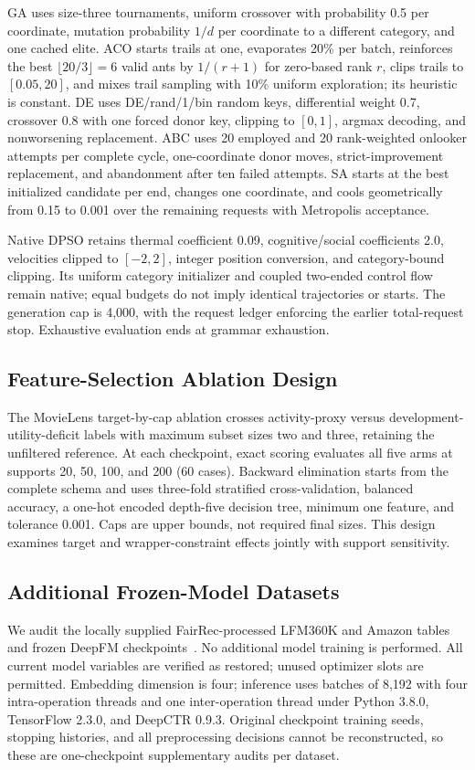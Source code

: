 GA uses size-three tournaments, uniform crossover with probability 0.5 per coordinate, mutation probability $1/d$ per coordinate to a different category, and one cached elite. ACO starts trails at one, evaporates 20\% per batch, reinforces the best $\lfloor20/3\rfloor=6$ valid ants by $1/(r+1)$ for zero-based rank $r$, clips trails to $[0.05,20]$, and mixes trail sampling with 10\% uniform exploration; its heuristic is constant. DE uses DE/rand/1/bin random keys, differential weight 0.7, crossover 0.8 with one forced donor key, clipping to $[0,1]$, argmax decoding, and nonworsening replacement. ABC uses 20 employed and 20 rank-weighted onlooker attempts per complete cycle, one-coordinate donor moves, strict-improvement replacement, and abandonment after ten failed attempts. SA starts at the best initialized candidate per end, changes one coordinate, and cools geometrically from 0.15 to 0.001 over the remaining requests with Metropolis acceptance.

Native DPSO retains thermal coefficient 0.09, cognitive/social coefficients 2.0, velocities clipped to $[-2,2]$, integer position conversion, and category-bound clipping. Its uniform category initializer and coupled two-ended control flow remain native; equal budgets do not imply identical trajectories or starts. The generation cap is 4,000, with the request ledger enforcing the earlier total-request stop. Exhaustive evaluation ends at grammar exhaustion.

\subsection{Feature-Selection Ablation Design}
The MovieLens target-by-cap ablation crosses activity-proxy versus development-utility-deficit labels with maximum subset sizes two and three, retaining the unfiltered reference. At each checkpoint, exact scoring evaluates all five arms at supports 20, 50, 100, and 200 (60 cases). Backward elimination starts from the complete schema and uses three-fold stratified cross-validation, balanced accuracy, a one-hot encoded depth-five decision tree, minimum one feature, and tolerance 0.001. Caps are upper bounds, not required final sizes. This design examines target and wrapper-constraint effects jointly with support sensitivity.

\subsection{Additional Frozen-Model Datasets}
We audit the locally supplied FairRec-processed LFM360K and Amazon tables and frozen DeepFM checkpoints~\cite{guo2023fairrec,guo2017deepfm}. No additional model training is performed. All current model variables are verified as restored; unused optimizer slots are permitted. Embedding dimension is four; inference uses batches of 8,192 with four intra-operation threads and one inter-operation thread under Python 3.8.0, TensorFlow 2.3.0, and DeepCTR 0.9.3. Original checkpoint training seeds, stopping histories, and all preprocessing decisions cannot be reconstructed, so these are one-checkpoint supplementary audits per dataset.

